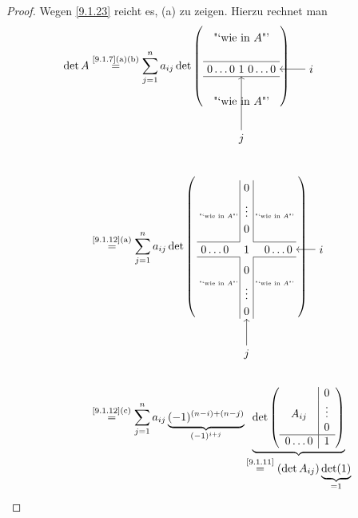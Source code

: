 \documentclass[../../main.tex]{subfiles}
\begin{document}
\begin{proof}
Wegen \ref{9.1.23} reicht es, (a) zu zeigen. Hierzu rechnet man
\begin{align*}
\det A & \overset{\text{\ref{9.1.7}(a)(b)}}= \sum_{j = 1}^{n} a_{ij} \det \left(
\begin{tikzpicture}[baseline={(current bounding box.center)}]
\node(O){"`wie in $A$"'};
\node[below of = O](M){$0\ldots0\ 1\ 0\ldots0$};
\node[below of = M]{"`wie in $A$"'};
\draw(M.south west)--(M.south east);
\draw(M.north west)--(M.north east);
\node[right of = M,xshift=1.2cm,overlay](I){$i$};
\node[below of = M,yshift=-1.2cm,overlay](J){$j$};
\draw[->,overlay](I.west)--(M.east);
\draw[->,overlay](J.north)--(M.south);
\end{tikzpicture}
\right)
\\[2cm]
&\overset{\text{\ref{9.1.12}(a)}}{=} \sum_{j = 1}^{n} a_{ij}
\det \left(
\begin{tikzpicture}[baseline={(current bounding box.center)}]
\node(ONE){$1$};
\node[left of = ONE](ONEL){$0 \ldots 0$};
\node[right of = ONE](ONER){$0 \ldots 0$};
\node[above of = ONE,yshift=-1em](OBEN1){$0$};
\node[below of = ONE,yshift=1em](UNTEN1){$0$};
\node[above of = OBEN1,yshift=-1em](OBEN2){$\vdots$};
\node[above of = OBEN2,yshift=-1em](OBEN3){$0$};
\node[below of = UNTEN1,yshift=1em](UNTEN2){$\vdots$};
\node[below of = UNTEN2,yshift=1em](UNTEN3){$0$};
\draw(OBEN3.north east)--(ONE.north east) -- (ONER.north east);
\draw(OBEN3.north west)--(ONE.north west) -- (ONEL.north west);
\draw(UNTEN3.south east)--(ONE.south east) -- (ONER.south east);
\draw(UNTEN3.south west)--(ONE.south west) -- (ONEL.south west);
\node[right of = ONER,xshift=1em,overlay](I){$i$};
\node[below of = UNTEN3,yshift=-1em,overlay](J){$j$};
\draw[->,overlay](I.west)--(ONER.east);
\draw[->,overlay](J.north)--(UNTEN3.south);
\node[above right of = ONE,xshift=0.5em,yshift=1em]{\tiny"`wie in $A$"'};
\node[above left of = ONE,xshift=-0.5em,yshift=1em]{\tiny"`wie in $A$"'};
\node[below left of = ONE,xshift=-0.5em,yshift=-1em]{\tiny"`wie in $A$"'};
\node[below right of = ONE,xshift=0.5em,yshift=-1em]{\tiny"`wie in $A$"'};
\end{tikzpicture}
\right)
\\[2cm]
& \overset{\text{\ref{9.1.12}(c)}}{=} \sum_{j = 1}^{n} a_{ij}\underbrace{(-1)^{(n-i)+(n-j)}}_{(-1)^{i+j}}\underbrace{\det \left(\begin{array}{c|c}
 & 0\\
A_{ij} & \vdots\\
& 0\\\hline
0\ldots 0 & 1
\end{array}\right)}_{\textstyle\overset{\text{\ref{9.1.11}}}{=}(\det A_{ij})\underbrace{\det (1)}_{=1}}
\end{align*}
\end{proof}
\end{document}
